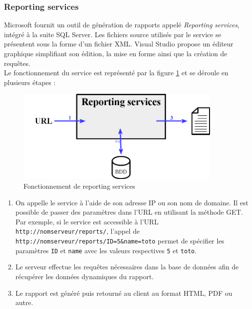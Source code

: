 
\subsubsection{Reporting services}

Microsoft fournit un outil de génération de rapports appelé \textit{Reporting services}, intégré à la suite SQL Server.
Les fichiers source utilisés par le service se présentent sous la forme d'un fichier XML.
Visual Studio propose un éditeur graphique simplifiant son édition, la mise en forme ainsi que la création de requêtes.
\\

Le fonctionnement du service est représenté par la figure \ref{reporting_services} et se déroule en plusieurs étapes :
\begin{figure}[!h]
	\center
	\includegraphics[width=0.9\textwidth]{img/reporting_services.png}
	\caption{Fonctionnement de reporting services}
	\label{reporting_services}
\end{figure}
\begin{enumerate}
	\item On appelle le service à l'aide de son adresse IP ou son nom de domaine.
Il est possible de passer des paramètres dans l'URL en utilisant la méthode GET.
Par exemple, si le service est accessible à l'URL \lstinline{http://nomserveur/reports/}, l'appel de \lstinline{http://nomserveur/reports/ID=5&name=toto} permet de spécifier les paramètres \lstinline{ID} et \lstinline{name} avec les valeurs respectives \lstinline{5} et \lstinline{toto}.
	\item Le serveur effectue les requêtes nécessaires dans la base de données afin de récupérer les données dynamiques du rapport.
	\item Le rapport est généré puis retourné au client au format HTML, PDF ou autre.
\end{enumerate}
~~\\

